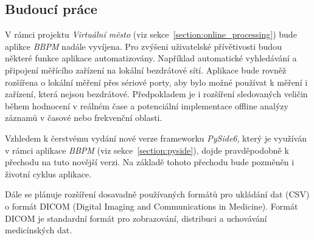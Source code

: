 \subsection{Budoucí práce}
V rámci projektu \textit{Virtuální město} (viz sekce~\ref{section:online_processing}) 
bude aplikce \textit{BBPM} nadále vyvíjena. Pro zvýšeni uživatelské přívětivosti budou 
některé funkce aplikace automatizovány. Například automatické vyhledávání a připojení 
měřícího zařízení na lokální bezdrátové sítí. Aplikace bude rovněž rozšířena o lokální
měření přes sériové porty, aby bylo možné používat k měření i zařízení, která nejsou
bezdrátové. Předpokladem je i rozšíření sledovaných veličin během hodnocení v reálném 
čase a potenciální implementace offline analýzy záznamů v časové nebo frekvenční oblasti. 

Vzhledem k čerstvému vydání nové verze frameworku \textit{PySide6}, který je využíván v rámci 
aplikace \textit{BBPM} (viz sekce~\ref{section:pyside}), dojde pravděpodobně k přechodu na 
tuto novější verzi. Na základě tohoto přechodu bude pozměněn i životní cyklus aplikace.

Dále se plánuje rozšíření dosavadně používaných formátů pro ukládání dat (CSV) o formát 
DICOM (Digital Imaging and Communications in Medicine). Formát DICOM je standardní 
formát pro zobrazování, distribuci a uchovávání medicínských dat. 

